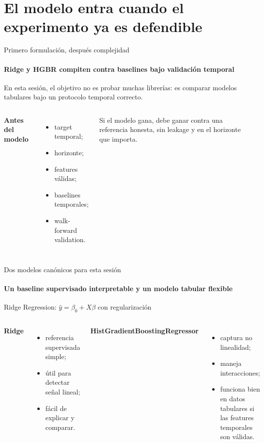 \documentclass[aspectratio=169,11pt]{beamer}  %
\newcommand{\Lg}{\fontsize{16}{20}\selectfont}
\newcommand{\bigstate}[1]{\begin{center}\Lg #1\end{center}}
\begin{document}
\section{El modelo entra cuando el experimento ya es defendible}

\begin{frame}{Primero formulación, después complejidad}
\framesubtitle{Ridge y HGBR compiten contra baselines bajo validación temporal}
\bigstate{En esta sesión, el objetivo no es probar muchas librerías: es comparar modelos tabulares bajo un protocolo temporal correcto.}
\begin{columns}[T]
\textbf{Antes del modelo}
\begin{itemize}
\item target temporal;
\item horizonte;
\item features válidas;
\item baselines temporales;
\item walk-forward validation.
\end{itemize}
\vspace{0.6em}
\begin{rulebox}
Si el modelo gana, debe ganar contra una referencia honesta, sin leakage y en el horizonte que importa.
\end{rulebox}
\end{columns}
\end{frame}

\begin{frame}{Dos modelos canónicos para esta sesión}
\framesubtitle{Un baseline supervisado interpretable y un modelo tabular flexible}
\vspace{1.5em}
\begin{center}\Lg
Ridge Regression: \qquad $\hat y = \beta_0 + X\beta$ \quad con regularización
\end{center}
\vspace{0.5em}
\begin{columns}[T]
\textbf{Ridge}
\begin{itemize}
\item referencia supervisada simple;
\item útil para detectar señal lineal;
\item fácil de explicar y comparar.
\end{itemize}
\textbf{HistGradientBoostingRegressor}
\begin{itemize}
\item captura no linealidad;
\item maneja interacciones;
\item funciona bien en datos tabulares si las features temporales son válidas.
\end{itemize}
\end{columns}
\end{frame}
\end{document}

